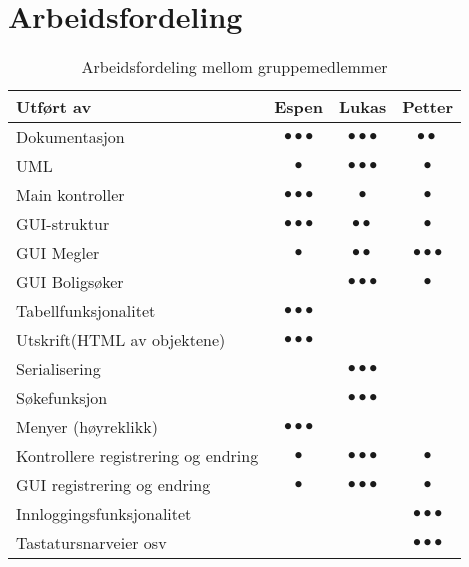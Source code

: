 \section{Arbeidsfordeling}

\begin{table}[ht!]
\center
\caption{Arbeidsfordeling mellom gruppemedlemmer}
\label{tab:arbeidsfordeling}
\begin{tabular}{|p{6.8cm}|c|c|c|}

\hline
Utført av					&Espen&Lukas	&Petter\\ \hline
Dokumentasjon				&$\bullet\bullet\bullet$&$\bullet\bullet\bullet$&$\bullet\bullet$\\	\hline
UML							&$\bullet$&$\bullet\bullet\bullet$&$\bullet$\\ \hline
Main kontroller				&$\bullet\bullet\bullet$&$\bullet$&$\bullet$\\ \hline
GUI-struktur					&$\bullet\bullet\bullet$&$\bullet\bullet$&$\bullet$\\ \hline
GUI Megler					&$\bullet$&$\bullet\bullet$&$\bullet\bullet\bullet$\\ \hline
GUI Boligsøker				&&$\bullet\bullet\bullet$&$\bullet$\\ \hline
Tabellfunksjonalitet			&$\bullet\bullet\bullet$&&\\ \hline
Utskrift(HTML av objektene)	&$\bullet\bullet\bullet$&&\\ \hline
Serialisering				&&$\bullet\bullet\bullet$&\\ \hline
Søkefunksjon					&&$\bullet\bullet\bullet$&\\ \hline
Menyer (høyreklikk)			&$\bullet\bullet\bullet$&&\\ \hline
Kontrollere registrering og endring		&$\bullet$&$\bullet\bullet\bullet$&$\bullet$\\ \hline
GUI registrering og endring		&$\bullet$&$\bullet\bullet\bullet$&$\bullet$\\ \hline
Innloggingsfunksjonalitet							&&&$\bullet\bullet\bullet$\\ \hline
Tastatursnarveier osv		&&&$\bullet\bullet\bullet$\\ \hline

\hline
\end{tabular}
\end{table}